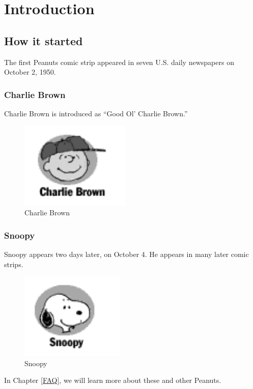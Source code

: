 \chapter{Introduction}

\section{How it started}

The first Peanuts comic strip appeared in seven U.S. daily newspapers on
October 2, 1950.

\subsection{Charlie Brown}

Charlie Brown is introduced as ``Good Ol' Charlie Brown.''

\begin{figure}
\centering
\includegraphics{charliebrown.pdf}
\caption{Charlie Brown}
\end{figure}

\subsection{Snoopy}

Snoopy appears two days later, on October 4. He appears in many later comic
strips. \cite{beingdog}

\begin{figure}
\centering
\includegraphics{snoopy.pdf}
\caption{Snoopy}
\end{figure}

In Chapter \ref{FAQ}, we will learn more about these and other Peanuts.

